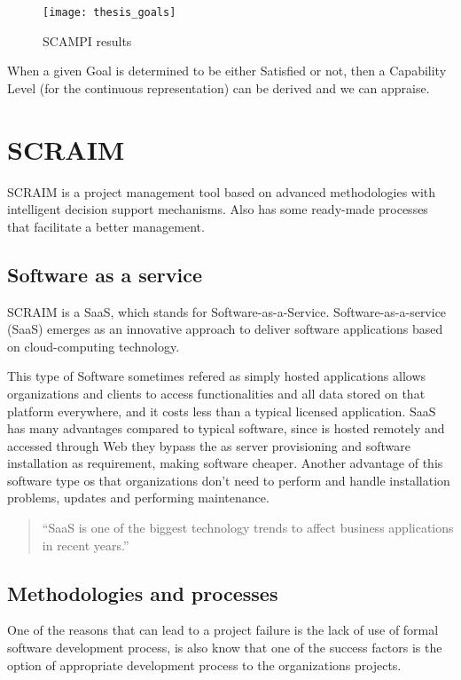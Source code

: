 \begin{figure}[h]
	\begin{center}
		\leavevmode
		\texttt{[image: thesis\_goals]}
		\caption{SCAMPI results}
		\label{fig:scampiresults}
	\end{center}
\end{figure}


When a given Goal is determined to be either Satisfied or not, then a Capability Level (for the continuous representation) can be derived and we can appraise.

\section{SCRAIM}

SCRAIM\citep{SCRAIM} is a project management tool based on advanced methodologies with intelligent decision support mechanisms. Also has some ready-made processes that facilitate a better management.

\subsection{Software as a service}

SCRAIM is a SaaS, which stands for Software-as-a-Service. Software-as-a-service (SaaS) emerges as an innovative
approach to deliver software applications based on cloud-computing
technology. \citep{Chou:2007:ANI:1359479.1359484}

This type of Software sometimes refered as simply hosted applications allows organizations and clients to access functionalities and all data stored on that platform everywhere, and it costs less than a typical licensed application. SaaS has many advantages compared to typical software, since is hosted remotely and accessed through Web they bypass the as server provisioning and software
installation as requirement, making software cheaper. Another advantage of this software type os that organizations don't need to perform and handle installation problems, updates and performing maintenance.

\begin{quote}
	``SaaS is one of the biggest technology trends to affect business
	applications in recent years.''~\cite{House2009}
\end{quote}

\subsection{Methodologies and processes}
One of the reasons that can lead to a project failure is the lack of use of formal software development process, is also know that one of the success factors is the option of appropriate development process to the organizations projects.

